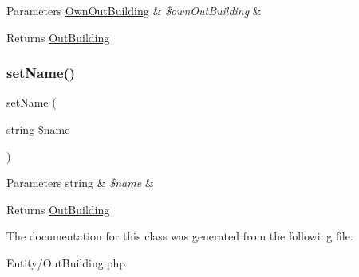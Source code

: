 \begin{DoxyParams}[1]{Parameters}
\mbox{\hyperlink{class_app_1_1_entity_1_1_own_out_building}{Own\+Out\+Building}} & {\em \$own\+Out\+Building} & \\
\hline
\end{DoxyParams}
\begin{DoxyReturn}{Returns}
\mbox{\hyperlink{class_app_1_1_entity_1_1_out_building}{Out\+Building}} 
\end{DoxyReturn}
\mbox{\label{class_app_1_1_entity_1_1_out_building_a392752b62c4f6aacea5c269690921ef3}} 
\subsubsection{\texorpdfstring{setName()}{setName()}}
{\footnotesize\ttfamily set\+Name (\begin{DoxyParamCaption}\item[{string}]{\$name }\end{DoxyParamCaption})}


\begin{DoxyParams}[1]{Parameters}
string & {\em \$name} & \\
\hline
\end{DoxyParams}
\begin{DoxyReturn}{Returns}
\mbox{\hyperlink{class_app_1_1_entity_1_1_out_building}{Out\+Building}} 
\end{DoxyReturn}


The documentation for this class was generated from the following file\+:\begin{DoxyCompactItemize}
\item 
Entity/Out\+Building.\+php\end{DoxyCompactItemize}
